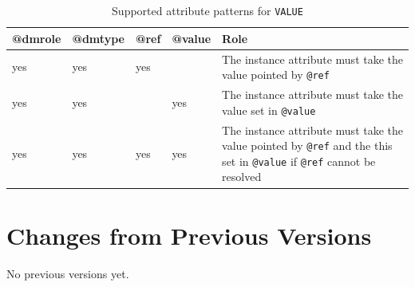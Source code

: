 \documentclass[11pt,a4paper]{ivoa}
\begin{document}
\begin{table}[ht!]
  \begin{tabular}{|p{1.5cm}|p{1.5cm}|p{1.5cm}|p{1.5cm}|p{5cm}|}
    \hline @dmrole  &  @dmtype &  @ref &  @value &  Role\\
    \hline  yes & yes &  yes & & The instance attribute must take the value pointed by \texttt{@ref} \\
    \hline  yes & yes &  & yes & The instance attribute must take the value set in  \texttt{@value} \\
    \hline  yes & yes &  yes & yes 
              & The instance attribute must take the value pointed by \texttt{@ref} 
                  \newline and the this set in  \texttt{@value} if \texttt{@ref} cannot be resolved\\
    \hline 
  \end{tabular}
  \caption{Supported attribute patterns for  \texttt{VALUE}} 
 \end{table}

\appendix
\section{Changes from Previous Versions}

No previous versions yet.  



\end{document}
